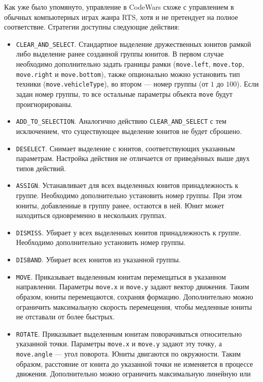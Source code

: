 Как уже было упомянуто, управление в CodeWars схоже с управлением в обычных компьютерных играх жанра RTS, хотя и не претендует на полное
соответствие. Стратегии доступны следующие действия:
\begin{itemize}
    \item \texttt{CLEAR\_AND\_SELECT}. Стандартное выделение дружественных юнитов рамкой либо выделение ранее созданной группы юнитов. В
          первом случае необходимо дополнительно задать границы рамки (\texttt{move.left}, \texttt{move.top}, \texttt{move.right} и
          \texttt{move.bottom}), также опционально можно установить тип техники (\texttt{move.vehicleType}), во втором --- номер группы (от
          $1$ до $100$). Если задан номер группы, то все остальные параметры объекта \texttt{move} будут проигнорированы.
    \item \texttt{ADD\_TO\_SELECTION}. Аналогично действию \texttt{CLEAR\_AND\_SELECT} с тем исключением, что существующее выделение юнитов
          не будет сброшено.
    \item \texttt{DESELECT}. Снимает выделение с юнитов, соответствующих указанным параметрам. Настройка действия не отличается от
          приведённых выше двух типов действий.
    \item \texttt{ASSIGN}. Устанавливает для всех выделенных юнитов принадлежность к группе. Необходимо дополнительно установить номер
          группы. При этом юниты, добавленные в группу ранее, остаются в ней. Юнит может находиться одновременно в нескольких группах.
    \item \texttt{DISMISS}. Убирает у всех выделенных юнитов принадлежность к группе. Необходимо дополнительно установить номер группы.
    \item \texttt{DISBAND}. Убирает всех юнитов из указанной группы.
    \item \texttt{MOVE}. Приказывает выделенным юнитам перемещаться в указанном направлении. Параметры \texttt{move.x} и \texttt{move.y}
          задают вектор движения. Таким образом, юниты перемещаются, сохраняя формацию. Дополнительно можно ограничить максимальную скорость
          перемещения, чтобы медленные юниты не отставали от более быстрых.
    \item \texttt{ROTATE}. Приказывает выделенным юнитам поворачиваться относительно указанной точки. Параметры \texttt{move.x} и
          \texttt{move.y} задают эту точку, а \texttt{move.angle} --- угол поворота. Юниты двигаются по окружности. Таким образом,
          расстояние от юнита до указанной точки не изменяется в процессе движения. Дополнительно можно ограничить максимальную линейную или

\end{itemize}
